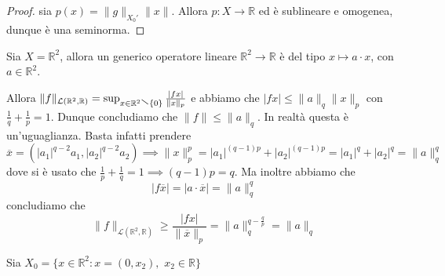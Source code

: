 \begin{proof}{}
    sia \(p{(x)} = \|g\|_{X_{0}'} \|x\| \). Allora \(p : X\to \mathbb{R}\) ed è
    sublineare e omogenea, dunque è una seminorma. 
\end{proof}
\begin{example}{}
    Sia \(X = \mathbb{R}^2\), allora un generico operatore lineare \(\mathbb{R}^2\to \mathbb{R}\) è del tipo \(x \mapsto a \cdot x\), con \(a \in \mathbb{R}^2\).

    Allora \(\|f\|_{\mathcal{L}{(\mathbb{R}^2, \mathbb{R})}}  = \sup_{x \in \mathbb{R}^2\sminus \{0\} } \frac{|fx|}{\|x\|_p}\) 
    e abbiamo che \(|fx| \le \|a\|_q \|x\|_p\) con \(\frac{1}{q}+\frac{1}{p} = 1\). Dunque concludiamo che \(\|f\| \le \|a\|_q\). In realtà questa è un'uguaglianza. Basta infatti prendere 
    \[
      \overline{x} = {\left( |a_{1}|^{q-2}a_{1}, |a_{2}|^{q-2}a_{2} \right)} \implies \|x\|_p^{p} = |a_{1}|^{{(q-1)}p} + |a_{2}|^{{(q-1)}p} = |a_{1}|^{q} + |a_{2}|^{q} = \|a\|_q^{q}
    \]
dove si è usato che \(\frac{1}{p}+\frac{1}{q} = 1 \implies {(q-1)}p = q\). Ma
inoltre abbiamo che
\[
  |f\overline{x}| = |a \cdot \overline{x}| = \|a\|_q^{q}
\]
concludiamo che
\[
  \|f\|_{\mathcal{L}{(\mathbb{R}^2, \mathbb{R})}} \ge \frac{|fx|}{\|\overline{x}\|_p} = \|a\|_q^{q - \frac{q}{p}} = \|a\|_q
\]
\end{example}

Sia \(X_{0} = \{x \in \mathbb{R}^2 : x = {(0,x_{2})},\,\, x_{2} \in \mathbb{R}\} \) 




